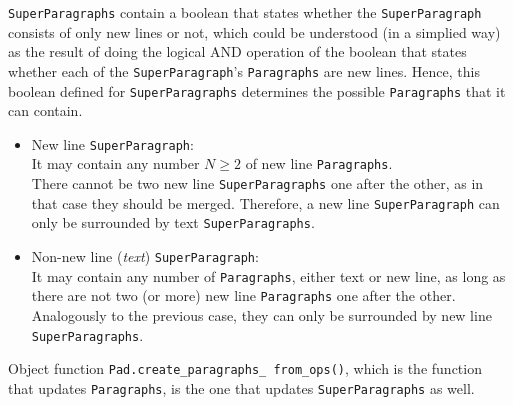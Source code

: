     \texttt{SuperParagraphs} contain a boolean that states whether the \texttt{SuperParagraph} consists of only new lines or not, which could be understood (in a simplied way) as the result of doing the logical AND operation of the boolean that states whether each of the \texttt{SuperParagraph}'s \texttt{Paragraphs} are new lines. Hence, this boolean defined for \texttt{SuperParagraphs} determines the possible \texttt{Paragraphs} that it can contain. 
    \begin{itemize}
        \item New line \texttt{SuperParagraph}:\\
        It may contain any number $N\geq 2$ of new line \texttt{Paragraphs}.\\
        There cannot be two new line \texttt{SuperParagraphs} one after the other, as in that case they should be merged. Therefore, a new line \texttt{SuperParagraph} can only be surrounded by text \texttt{SuperParagraphs}.
        \item Non-new line (\textit{text}) \texttt{SuperParagraph}:\\
        It may contain any number of \texttt{Paragraphs}, either text or new line, as long as there are not two (or more) new line \texttt{Paragraphs} one after the other.\\
        Analogously to the previous case, they can only be surrounded by new line \texttt{SuperParagraphs}.
    \end{itemize}
    
    Object function \texttt{Pad.create\_paragraphs\_ from\_ops()}, which is the function that updates \texttt{Paragraphs}, is the one that updates \texttt{SuperParagraphs} as well.
    
      \begin{table}[htp]
        \caption{Rules for updating \texttt{SuperParagraphs} after inserting or deleting a \texttt{Paragraph}. \textbf{NL} stands for \textit{New Line} and \textbf{T} stands for \textit{Text}.}
        \label{tab:sup_paras}

        \centering
      \end{table}
    
